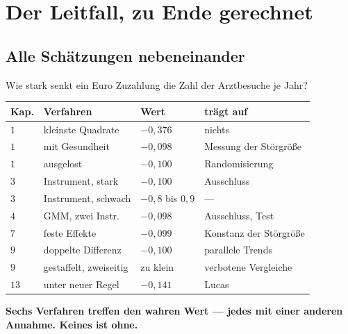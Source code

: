 \chapter{Der Leitfall, zu Ende gerechnet}

\section{Alle Schätzungen nebeneinander}

\begin{merksatz}
Wie stark senkt ein Euro Zuzahlung die Zahl der Arztbesuche je Jahr?

\begin{center}
{\small
\renewcommand{\arraystretch}{1.46}
\begin{tabular}{@{}P{0.8cm}P{3.2cm}P{2.0cm}P{2.6cm}@{}}
\toprule
\textbf{Kap.} & \textbf{Verfahren} & \textbf{Wert} & \textbf{trägt auf}\\
\midrule
$1$ & kleinste Quadrate & $-0{,}376$ & nichts\\
$1$ & mit Gesundheit & $-0{,}098$ & Messung der Störgröße\\
$1$ & ausgelost & $-0{,}100$ & Randomisierung\\
$3$ & Instrument, stark & $-0{,}100$ & Ausschluss\\
$3$ & Instrument, schwach & $-0{,}8$ bis $0{,}9$ & ---\\
$4$ & GMM, zwei Instr. & $-0{,}098$ & Ausschluss, Test\\
$7$ & feste Effekte & $-0{,}099$ & Konstanz der Störgröße\\
$9$ & doppelte Differenz & $-0{,}100$ & parallele Trends\\
$9$ & gestaffelt, zweiseitig & zu klein & \textcolor{akzent}{verbotene Vergleiche}\\
$13$ & unter neuer Regel & $-0{,}141$ & Lucas\\
\bottomrule
\end{tabular}}
\end{center}

\begin{center}
\begin{minipage}{0.9\textwidth}
\textbf{Sechs Verfahren treffen den wahren Wert --- jedes mit einer anderen Annahme. Keines ist ohne.}
\end{minipage}
\end{center}

\begin{center}
\begin{minipage}{0.88\textwidth}
\end{minipage}
\end{center}
\end{merksatz}

